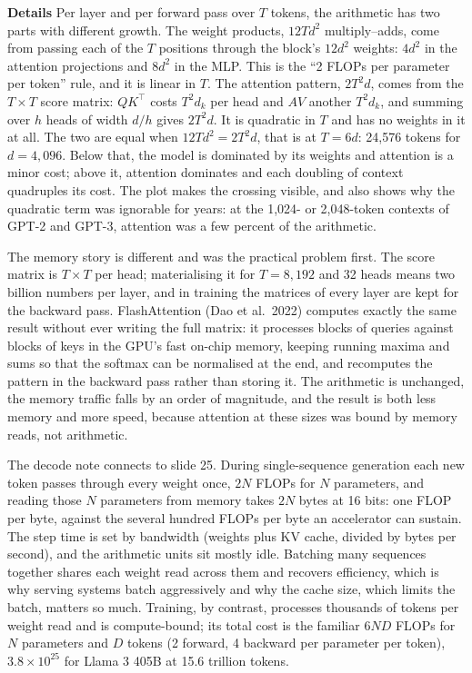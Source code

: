 \documentclass[11pt,letterpaper]{article}
\newcommand{\para}[1]{\medskip\noindent\textbf{#1}\quad}
\newcommand{\dk}{d_k}
\begin{document}
\para{Details} Per layer and per forward pass over $T$ tokens, the arithmetic has two parts with different growth. The weight products, $12Td^2$ multiply--adds, come from passing each of the $T$ positions through the block's $12d^2$ weights: $4d^2$ in the attention projections and $8d^2$ in the MLP. This is the ``2 FLOPs per parameter per token'' rule, and it is linear in $T$. The attention pattern, $2T^2d$, comes from the $T\times T$ score matrix: $QK^{\top}$ costs $T^2\dk$ per head and $AV$ another $T^2\dk$, and summing over $h$ heads of width $d/h$ gives $2T^2d$. It is quadratic in $T$ and has no weights in it at all. The two are equal when $12Td^2=2T^2d$, that is at $T=6d$: 24,576 tokens for $d=4{,}096$. Below that, the model is dominated by its weights and attention is a minor cost; above it, attention dominates and each doubling of context quadruples its cost. The plot makes the crossing visible, and also shows why the quadratic term was ignorable for years: at the 1,024- or 2,048-token contexts of GPT-2 and GPT-3, attention was a few percent of the arithmetic.

The memory story is different and was the practical problem first. The score matrix is $T\times T$ per head; materialising it for $T=8{,}192$ and 32 heads means two billion numbers per layer, and in training the matrices of every layer are kept for the backward pass. FlashAttention (Dao et al.\ 2022) computes exactly the same result without ever writing the full matrix: it processes blocks of queries against blocks of keys in the GPU's fast on-chip memory, keeping running maxima and sums so that the softmax can be normalised at the end, and recomputes the pattern in the backward pass rather than storing it. The arithmetic is unchanged, the memory traffic falls by an order of magnitude, and the result is both less memory and more speed, because attention at these sizes was bound by memory reads, not arithmetic.

The decode note connects to slide 25. During single-sequence generation each new token passes through every weight once, $2N$ FLOPs for $N$ parameters, and reading those $N$ parameters from memory takes $2N$ bytes at 16 bits: one FLOP per byte, against the several hundred FLOPs per byte an accelerator can sustain. The step time is set by bandwidth (weights plus KV cache, divided by bytes per second), and the arithmetic units sit mostly idle. Batching many sequences together shares each weight read across them and recovers efficiency, which is why serving systems batch aggressively and why the cache size, which limits the batch, matters so much. Training, by contrast, processes thousands of tokens per weight read and is compute-bound; its total cost is the familiar $6ND$ FLOPs for $N$ parameters and $D$ tokens (2 forward, 4 backward per parameter per token), $3.8\times10^{25}$ for Llama 3 405B at 15.6 trillion tokens.
\end{document}

